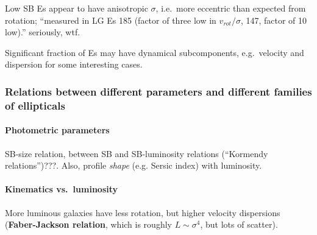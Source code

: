 \documentclass{article}
\newcommand{\mynotes}[1]{\textcolor{cadmiumgreen}{#1}}
\begin{document}
Low SB Es appear to have anisotropic $\sigma$, i.e.\ more eccentric than
expected from rotation; ``measured in LG Es 185 (factor of three low in
$v_{rot}/\sigma$, 147, factor of 10 low).'' \mynotes{seriously, wtf}.

Significant fraction of Es may have dynamical subcomponents, e.g.\ velocity
and dispersion for some interesting cases.

\subsubsection{Relations between different parameters and different families
of ellipticals}

\paragraph{Photometric parameters}
SB-size relation, between SB and SB-luminosity relations
(``Kormendy relations'')\mynotes{???}.
Also, profile \emph{shape} (e.g. Sersic index) with luminosity.

\paragraph{Kinematics vs.\ luminosity}
More luminous galaxies have less rotation, but higher velocity dispersions
(\textbf{Faber-Jackson relation}, which is roughly $L\sim\sigma^{4}$, but
lots of scatter).
\end{document}
